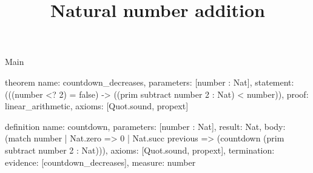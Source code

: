 \begin{lexlean}{Main}
\title{Natural number addition}
\begin{semanticmodule}
theorem{
  name: countdown_decreases,
  parameters: [number : Nat],
  statement: (((number <? 2) = false) -> ((prim subtract number 2 : Nat) < number)),
  proof: linear_arithmetic{},
  axioms: [Quot.sound, propext]
}

definition{
  name: countdown,
  parameters: [number : Nat],
  result: Nat,
  body: (match number
    | Nat.zero => 0
    | Nat.succ previous => (countdown (prim subtract number 2 : Nat))),
  axioms: [Quot.sound, propext],
  termination: {evidence: [countdown_decreases], measure: number}
}
\end{semanticmodule}
\end{lexlean}
